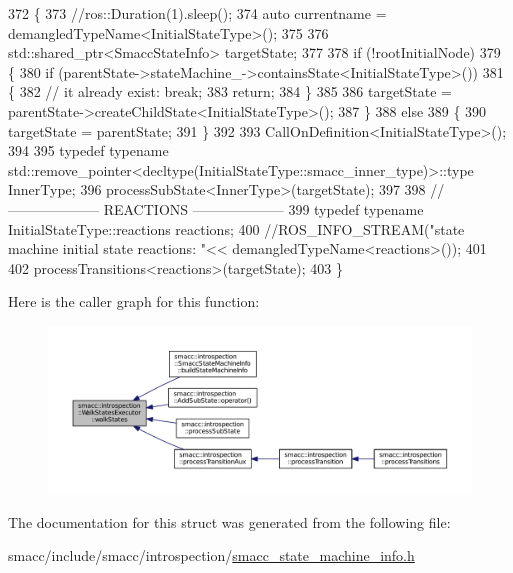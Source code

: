 \begin{DoxyCode}
372 \{
373     \textcolor{comment}{//ros::Duration(1).sleep();}
374     \textcolor{keyword}{auto} currentname = demangledTypeName<InitialStateType>();
375 
376     std::shared\_ptr<SmaccStateInfo> targetState;
377 
378     \textcolor{keywordflow}{if} (!rootInitialNode)
379     \{
380         \textcolor{keywordflow}{if} (parentState->stateMachine\_->containsState<InitialStateType>())
381         \{
382             \textcolor{comment}{// it already exist: break;}
383             \textcolor{keywordflow}{return};
384         \}
385 
386         targetState = parentState->createChildState<InitialStateType>();
387     \}
388     \textcolor{keywordflow}{else}
389     \{
390         targetState = parentState;
391     \}
392 
393     CallOnDefinition<InitialStateType>();
394 
395     \textcolor{keyword}{typedef} \textcolor{keyword}{typename} std::remove\_pointer<decltype(InitialStateType::smacc\_inner\_type)>::type InnerType;
396     processSubState<InnerType>(targetState);
397 
398     \textcolor{comment}{// -------------------- REACTIONS --------------------}
399     \textcolor{keyword}{typedef} \textcolor{keyword}{typename} InitialStateType::reactions reactions;
400     \textcolor{comment}{//ROS\_INFO\_STREAM("state machine initial state reactions: "<< demangledTypeName<reactions>());}
401 
402     processTransitions<reactions>(targetState);
403 \}
\end{DoxyCode}


Here is the caller graph for this function\+:
\nopagebreak
\begin{figure}[H]
\begin{center}
\leavevmode
\includegraphics[width=350pt]{structsmacc_1_1introspection_1_1WalkStatesExecutor_a21848ccc6e7a7ddee0ccfff97e550ec6_icgraph}
\end{center}
\end{figure}




The documentation for this struct was generated from the following file\+:\begin{DoxyCompactItemize}
\item 
smacc/include/smacc/introspection/\hyperlink{smacc__state__machine__info_8h}{smacc\+\_\+state\+\_\+machine\+\_\+info.\+h}\end{DoxyCompactItemize}
